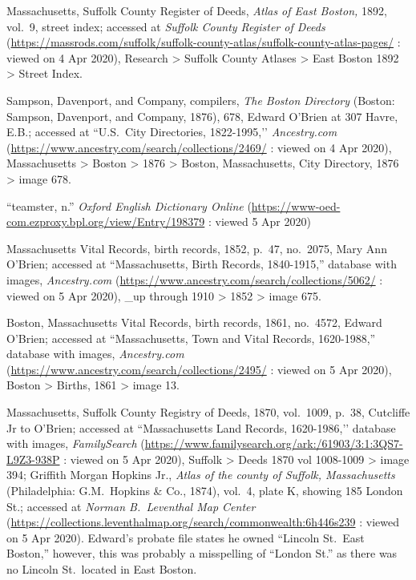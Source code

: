 \begin{thebibliography}{999}
Massachusetts, Suffolk County Register of Deeds, \textit{Atlas of East Boston,} 1892, vol.\ 9, street index; accessed at \textit{Suffolk County Register of Deeds} (\url{https://massrods.com/suffolk/suffolk-county-atlas/suffolk-county-atlas-pages/} : viewed on 4 Apr 2020), Research > Suffolk County Atlases > East Boston 1892 > Street Index.

Sampson, Davenport, and Company, compilers, \textit{The Boston Directory} (Boston: Sampson, Davenport, and Company, 1876), 678, Edward O’Brien at 307 Havre, E.B.; accessed at ``U.S.\ City Directories, 1822-1995,’’ \textit{Ancestry.com} (\url{https://www.ancestry.com/search/collections/2469/} : viewed on 4 Apr 2020), Massachusetts > Boston > 1876 > Boston, Massachusetts, City Directory, 1876 > image 678. 

``teamster, n.'' \textit{Oxford English Dictionary Online} (\url{https://www-oed-com.ezproxy.bpl.org/view/Entry/198379} : viewed 5 Apr 2020)

Massachusetts Vital Records, birth records, 1852, p.\ 47, no.\ 2075, Mary Ann O'Brien; accessed at ``Massachusetts, Birth Records, 1840-1915,'' database with images, \textit{Ancestry.com} (\url{https://www.ancestry.com/search/collections/5062/} : viewed on 5 Apr 2020), \_up through 1910 > 1852 > image 675.

Boston, Massachusetts Vital Records, birth records, 1861, no.\ 4572, Edward O'Brien; accessed at ``Massachusetts, Town and Vital Records, 1620-1988,'' database with images, \textit{Ancestry.com} (\url{https://www.ancestry.com/search/collections/2495/} : viewed on 5 Apr 2020), Boston > Births, 1861 > image 13.

Massachusetts, Suffolk County Registry of Deeds, 1870, vol.\ 1009, p.\ 38, Cutcliffe Jr to O’Brien; accessed at ``Massachusetts Land Records, 1620-1986,’’ database with images, \textit{FamilySearch} (\url{https://www.familysearch.org/ark:/61903/3:1:3QS7-L9Z3-938P} : viewed on 5 Apr 2020), Suffolk > Deeds 1870 vol 1008-1009 > image 394; Griffith Morgan Hopkins Jr., \textit{Atlas of the county of Suffolk, Massachusetts} (Philadelphia: G.M.\ Hopkins \& Co., 1874), vol.\ 4, plate K, showing 185 London St.; accessed at \textit{Norman B.\ Leventhal Map Center} (\url{https://collections.leventhalmap.org/search/commonwealth:6h446s239} : viewed on 5 Apr 2020). Edward's probate file states he owned ``Lincoln St.\  East Boston,'' however, this was probably a misspelling of ``London St.'' as there was no Lincoln St.\ located in East Boston.


\end{thebibliography}
